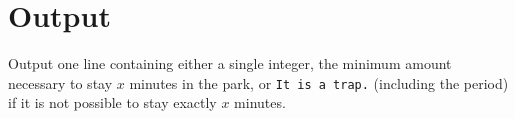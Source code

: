 %

\section*{Output}
Output one line containing either a single integer, the minimum amount necessary to stay $x$ minutes in the park, or \texttt{It is a trap.} (including the period) if it is not possible to stay exactly $x$ minutes.
